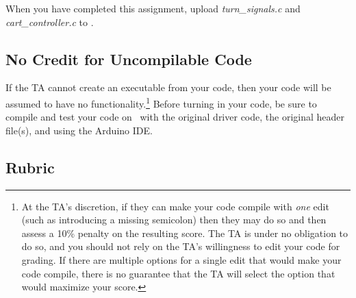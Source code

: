 When you have completed this assignment, upload \textit{turn\_signals.c} and \textit{cart\_controller.c} to
\filesubmission.

\subsection*{No Credit for Uncompilable Code}
If the TA cannot create an executable from your code, then your code will be assumed to have no functionality.\footnote{
    At the TA's discretion, if they can make your code compile with \textit{one} edit (such as introducing a missing semicolon) then they may do so and then assess a 10\% penalty on the resulting score.
    The TA is under no obligation to do so, and you should not rely on the TA's willingness to edit your code for grading.
    If there are multiple options for a single edit that would make your code compile, there is no guarantee that the TA will select the option that would maximize your score.
}
Before turning in your code, be sure to compile and test your code on \runtimeenvironment\ with the original driver code, the original header file(s), and using the Arduino IDE\@.

\interruptlablatepolicy

\subsection*{Rubric}

